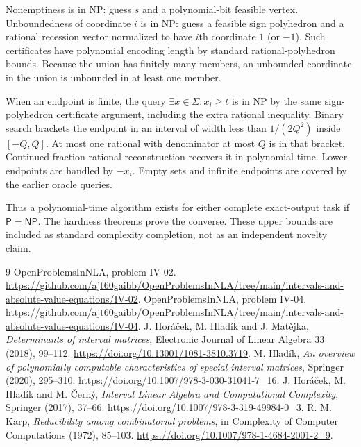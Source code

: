 \documentclass[11pt,a4paper]{article}
\theoremstyle{remark}\newtheorem{remark}[theorem]{Remark}
\newcommand{\NP}{\mathsf{NP}}
\newcommand{\PP}{\mathsf P}
\newcommand{\repo}[1]{\url{https://github.com/ajt60gaibb/OpenProblemsInNLA/tree/main/intervals-and-absolute-value-equations/#1}}
\begin{document}
Nonemptiness is in NP: guess $s$ and a polynomial-bit feasible vertex. Unboundedness of coordinate $i$ is in NP: guess a feasible sign polyhedron and a rational recession vector normalized to have $i$th coordinate $1$ (or $-1$). Such certificates have polynomial encoding length by standard rational-polyhedron bounds. Because the union has finitely many members, an unbounded coordinate in the union is unbounded in at least one member.

When an endpoint is finite, the query $\exists x\in\Sigma:x_i\ge t$ is in NP by the same sign-polyhedron certificate argument, including the extra rational inequality. Binary search brackets the endpoint in an interval of width less than $1/(2Q^2)$ inside $[-Q,Q]$. At most one rational with denominator at most $Q$ is in that bracket. Continued-fraction rational reconstruction recovers it in polynomial time. Lower endpoints are handled by $-x_i$. Empty sets and infinite endpoints are covered by the earlier oracle queries.

Thus a polynomial-time algorithm exists for either complete exact-output task if $\PP=\NP$. The hardness theorems prove the converse. These upper bounds are included as standard complexity completion, not as an independent novelty claim.
\begin{thebibliography}{9}
 OpenProblemsInNLA, problem IV-02. \repo{IV-02}.
 OpenProblemsInNLA, problem IV-04. \repo{IV-04}.
 J. Hor\'a\v cek, M. Hlad\'ik and J. Mat\v ejka, \emph{Determinants of interval matrices}, Electronic Journal of Linear Algebra 33 (2018), 99--112. \url{https://doi.org/10.13001/1081-3810.3719}.
 M. Hlad\'ik, \emph{An overview of polynomially computable characteristics of special interval matrices}, Springer (2020), 295--310. \url{https://doi.org/10.1007/978-3-030-31041-7_16}.
 J. Hor\'a\v cek, M. Hlad\'ik and M. \v Cern\'y, \emph{Interval Linear Algebra and Computational Complexity}, Springer (2017), 37--66. \url{https://doi.org/10.1007/978-3-319-49984-0_3}.
 R. M. Karp, \emph{Reducibility among combinatorial problems}, in Complexity of Computer Computations (1972), 85--103. \url{https://doi.org/10.1007/978-1-4684-2001-2_9}.
\end{thebibliography}
\end{document}
